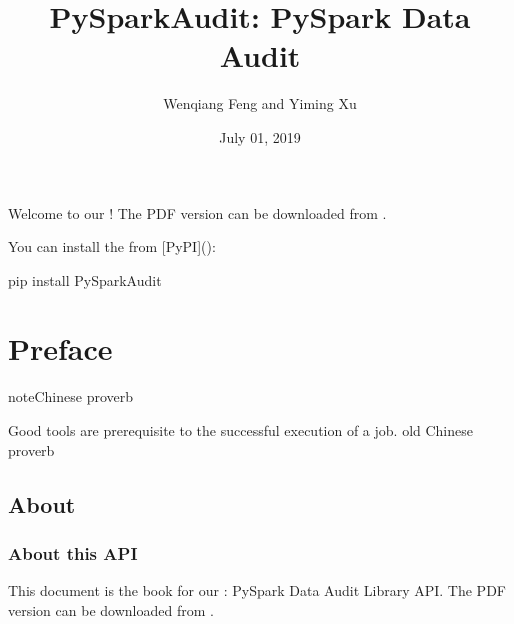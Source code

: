 \documentclass[letterpaper,12pt,english]{sphinxmanual}
\title{PySparkAudit: PySpark Data Audit}
\date{July 01, 2019}
\author{Wenqiang Feng and Yiming Xu}
\begin{document}
\pagestyle{empty}
\maketitle
\pagestyle{plain}
\sphinxtableofcontents
\pagestyle{normal}
\label{\detokenize{index::doc}}\label{\detokenize{index:index}}\begin{quote}

\begin{figure}[htbp]
\centering

\noindent{}
\end{figure}
\end{quote}

Welcome to our ! The PDF version can be downloaded from .

You can install the  from {[}PyPI{]}():

%
\begin{sphinxVerbatim}[commandchars=\\\{\}]
pip install PySparkAudit
\end{sphinxVerbatim}




\chapter{Preface}
\label{\detokenize{preface:preface}}\label{\detokenize{preface:id1}}\label{\detokenize{preface::doc}}
\begin{sphinxadmonition}{note}{Chinese proverb}

Good tools are prerequisite to the successful execution of a job. \textendash{} old Chinese proverb
\end{sphinxadmonition}


\section{About}
\label{\detokenize{preface:about}}

\subsection{About this API}
\label{\detokenize{preface:about-this-api}}
This document is the  book for our : PySpark Data Audit Library  API. The PDF version can be downloaded from . 
\end{document}
